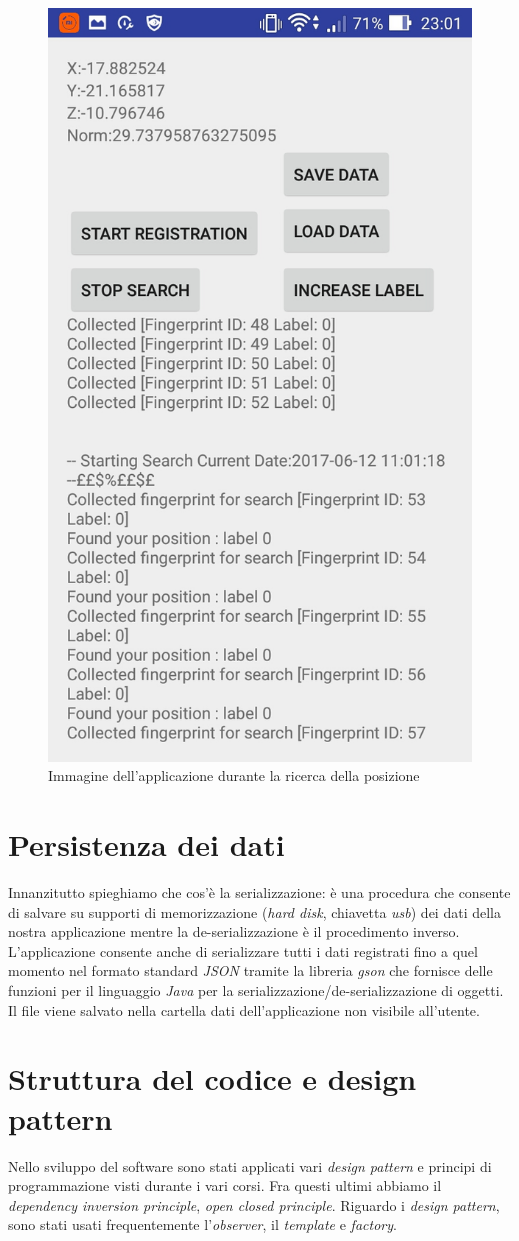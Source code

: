 \begin{figure}[H]
	\centering
	\includegraphics[width=0.4\linewidth]{img/app2}
	\caption{Immagine dell'applicazione durante la ricerca della posizione}
	\label{fig:app2}
\end{figure}


\section{Persistenza dei dati}
Innanzitutto spieghiamo che cos'\`e la serializzazione: \`e una procedura che consente di salvare su supporti di memorizzazione (\textit{hard disk}, chiavetta \textit{usb}) dei dati della nostra applicazione mentre la de-serializzazione \`e il procedimento inverso.
L'applicazione consente anche di serializzare tutti i dati registrati fino a quel momento nel formato standard \textit{JSON} tramite la libreria \textit{gson} che fornisce delle funzioni  per il linguaggio \textit{Java} per la serializzazione/de-serializzazione di oggetti. Il file viene salvato nella cartella dati dell'applicazione non visibile all'utente.

\section{Struttura del codice e design pattern}
Nello sviluppo del software sono stati applicati vari \textit{design pattern} e principi di programmazione visti durante i vari corsi. Fra questi ultimi abbiamo il \textit{dependency inversion principle}, \textit{open closed principle}. Riguardo i \textit{design pattern}, sono stati usati frequentemente l'\textit{observer}, il \textit{template} e \textit{factory}.

